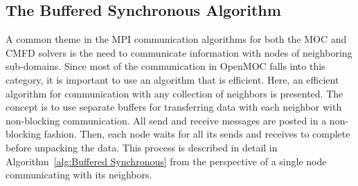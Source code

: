 \subsection{The Buffered Synchronous Algorithm}

A common theme in the \ac{MPI} communication algorithms for both the \ac{MOC} and \ac{CMFD} solvers is the need to communicate information with nodes of neighboring sub-domains. Since most of the communication in OpenMOC falls into this category, it is important to use an algorithm that is efficient. Here, an efficient algorithm for communication with any collection of neighbors is presented. The concept is to use separate buffers for transferring data with each neighbor with non-blocking communication. All send and receive messages are posted in a non-blocking fashion. Then, each node waits for all its sends and receives to complete before unpacking the data. This process is described in detail in Algorithm~\ref{alg:Buffered Synchronous} from the perspective of a single node communicating with its neighbors.


